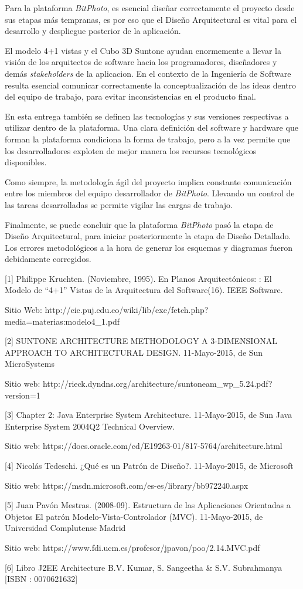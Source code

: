 \documentclass{memoria}
\begin{document}
Para la plataforma \textsl{BitPhoto}, es esencial diseñar correctamente el proyecto desde sus etapas más tempranas, es por eso que el Diseño Arquitectural es vital para el desarrollo y despliegue posterior de la aplicación.

El modelo 4+1 vistas y el Cubo 3D Suntone ayudan enormemente a llevar la visión de los arquitectos de software hacia los programadores, diseñadores y demás \textsl{stakeholders} de la aplicacion. En el contexto de la Ingeniería de Software resulta esencial comunicar correctamente la conceptualización de las ideas dentro del equipo de trabajo, para evitar inconsistencias en el producto final.

En esta entrega también se definen las tecnologías y sus versiones respectivas a utilizar dentro de la plataforma. Una clara definición del software y hardware que forman la plataforma condiciona la forma de trabajo, pero a la vez permite que los desarrolladores exploten de mejor manera los recursos tecnológicos disponibles.

Como siempre, la metodología ágil del proyecto implica constante comunicación entre los miembros del equipo desarrollador de \textsl{BitPhoto}. Llevando un control de las tareas desarrolladas se permite vigilar las cargas de trabajo.

Finalmente, se puede concluir que la plataforma \textsl{BitPhoto} pasó la etapa de Diseño Arquitectural, para iniciar posteriormente la etapa de Diseño Detallado. Los errores metodológicos a la hora de generar los esquemas y diagramas fueron debidamente corregidos.




[1] Philippe Kruchten. (Noviembre, 1995). En Planos Arquitectónicos: : El Modelo de “4+1” Vistas de la Arquitectura del Software(16). IEEE Software. 

Sitio Web: http://cic.puj.edu.co/wiki/lib/exe/fetch.php?media=materias:modelo4\_1.pdf

[2] SUNTONE ARCHITECTURE METHODOLOGY A 3-DIMENSIONAL APPROACH TO ARCHITECTURAL DESIGN. 11-Mayo-2015, de Sun MicroSystems 

Sitio web: http://rieck.dyndns.org/architecture/suntoneam\_wp\_5.24.pdf?version=1

[3] Chapter 2: Java Enterprise System Architecture. 11-Mayo-2015, de Sun Java Enterprise System 2004Q2 Technical Overview. 

Sitio web: https://docs.oracle.com/cd/E19263-01/817-5764/architecture.html

[4] Nicolás Tedeschi. ¿Qué es un Patrón de Diseño?. 11-Mayo-2015, de Microsoft 

Sitio web: https://msdn.microsoft.com/es-es/library/bb972240.aspx

[5] Juan Pavón Mestras. (2008-09). Estructura de las Aplicaciones Orientadas a Objetos El patrón Modelo-Vista-Controlador (MVC). 11-Mayo-2015, de Universidad Complutense Madrid 

Sitio web: https://www.fdi.ucm.es/profesor/jpavon/poo/2.14.MVC.pdf

[6] Libro J2EE Architecture \- B.V. Kumar, S. Sangeetha \& S.V. Subrahmanya [ISBN : 0070621632]
\end{document}
